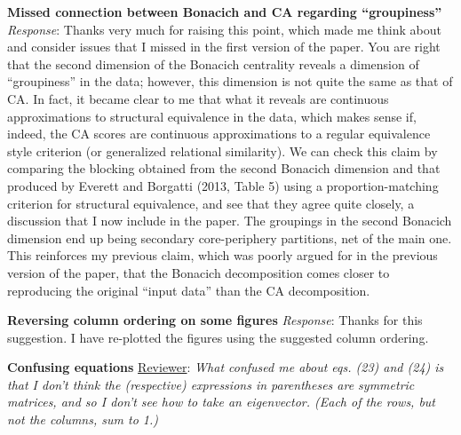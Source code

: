 \documentclass{article}
\begin{document}
\noindent\textbf{Missed connection between Bonacich and CA regarding ``groupiness''}\newline
\textit{Response}: Thanks very much for raising this point, which made me think about and consider issues that I missed in the first version of the paper. You are right that the second dimension of the Bonacich centrality reveals a dimension of ``groupiness'' in the data; however, this dimension is not quite the same as that of CA. In fact, it became clear to me that what it reveals are continuous approximations to structural equivalence in the data, which makes sense if, indeed, the CA scores are continuous approximations to a regular equivalence style criterion (or generalized relational similarity). We can check this claim by comparing the blocking obtained from the second Bonacich dimension and that produced by Everett and Borgatti (2013, Table 5) using a proportion-matching criterion for structural equivalence, and see that they agree quite closely, a discussion that I now include in the paper. The groupings in the second Bonacich dimension end up being secondary core-periphery partitions, net of the main one. This reinforces my previous claim, which was poorly argued for in the previous version of the paper, that the Bonacich decomposition comes closer to reproducing the original ``input data'' than the CA decomposition. \newline

\noindent\textbf{Reversing column ordering on some figures}\newline
\textit{Response}: Thanks for this suggestion. I have re-plotted the figures using the suggested column ordering. \newline

\noindent\textbf{Confusing equations}\newline
\underline{Reviewer}: \textit{What confused me about eqs. (23) and (24) is that I don't think the (respective) expressions in parentheses are symmetric matrices, and so I don't see how to take an eigenvector. (Each of the rows, but not the columns, sum to 1.)}
\end{document}
